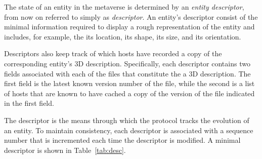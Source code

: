 The state of an entity in the metaverse is determined by an
\emph{entity descriptor}, from now on referred to simply as
\emph{descriptor}.  An entity's descriptor consist of the minimal
information required to display a rough representation of the entity
and includes, for example, the its location, its shape, its size, and its
orientation.




Descriptors also keep track of which hosts have recorded a copy of the
corresponding entity's 3D description. Specifically, each descriptor
contains two fields associated with each of the files that constitute
the a 3D description. The first field is the latest known version
number of the file, while the second is a list of hosts that are known
to have cached a copy of the version of the file indicated in the
first field.

The descriptor is the means through which the \sol protocol tracks the
evolution of an entity. To maintain consistency, each descriptor is
associated with a sequence number that is incremented each time the
descriptor is modified. A minimal descriptor is shown in
Table~\ref{tab:desc}. 

